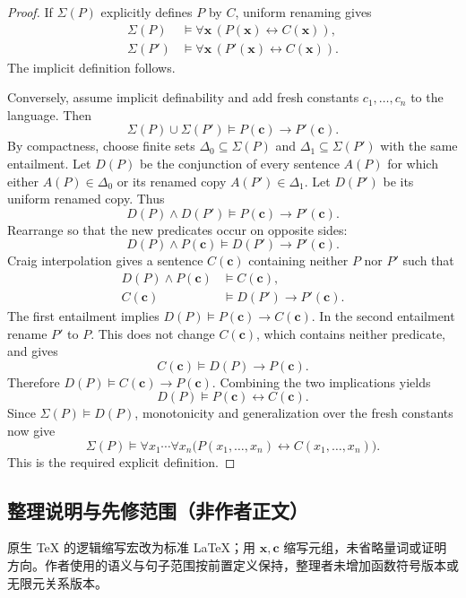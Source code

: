 \documentclass[UTF8,11pt]{ctexart}
\theoremstyle{definition}
\begin{document}
\begin{proof}
If $\Sigma(P)$ explicitly defines $P$ by $C$, uniform renaming gives
\[
\begin{aligned}
 \Sigma(P)&\models\forall\mathbf x\,(P(\mathbf x)\leftrightarrow C(\mathbf x)),\\
 \Sigma(P')&\models\forall\mathbf x\,(P'(\mathbf x)\leftrightarrow C(\mathbf x)).
\end{aligned}
\]
The implicit definition follows.

Conversely, assume implicit definability and add fresh constants
$c_1,\ldots,c_n$ to the language. Then
\[
 \Sigma(P)\cup\Sigma(P')\models P(\mathbf c)\to P'(\mathbf c).
\]
By compactness, choose finite sets $\Delta_0\subseteq\Sigma(P)$ and
$\Delta_1\subseteq\Sigma(P')$ with the same entailment. Let $D(P)$ be the
conjunction of every sentence $A(P)$ for which either $A(P)\in\Delta_0$
or its renamed copy $A(P')\in\Delta_1$. Let $D(P')$ be its uniform renamed
copy. Thus
\[
 D(P)\land D(P')\models P(\mathbf c)\to P'(\mathbf c).
\]
Rearrange so that the new predicates occur on opposite sides:
\[
 D(P)\land P(\mathbf c)\models D(P')\to P'(\mathbf c).
\]
Craig interpolation gives a sentence $C(\mathbf c)$ containing neither
$P$ nor $P'$ such that
\[
\begin{aligned}
 D(P)\land P(\mathbf c)&\models C(\mathbf c),\\
 C(\mathbf c)&\models D(P')\to P'(\mathbf c).
\end{aligned}
\]
The first entailment implies
$D(P)\models P(\mathbf c)\to C(\mathbf c)$.
In the second entailment rename $P'$ to $P$. This does not change
$C(\mathbf c)$, which contains neither predicate, and gives
\[
 C(\mathbf c)\models D(P)\to P(\mathbf c).
\]
Therefore $D(P)\models C(\mathbf c)\to P(\mathbf c)$. Combining the two
implications yields
\[
 D(P)\models P(\mathbf c)\leftrightarrow C(\mathbf c).
\]
Since $\Sigma(P)\models D(P)$, monotonicity and generalization over the
fresh constants now give
\[
 \Sigma(P)\models\forall x_1\cdots\forall x_n
        \bigl(P(x_1,\ldots,x_n)\leftrightarrow C(x_1,\ldots,x_n)\bigr).
\]
This is the required explicit definition.
\end{proof}

\subsection*{整理说明与先修范围（非作者正文）}
原生 TeX 的逻辑缩写宏改为标准 LaTeX；用 $\mathbf x,\mathbf c$ 缩写元组，未省略量词或证明方向。作者使用的语义与句子范围按前置定义保持，整理者未增加函数符号版本或无限元关系版本。
\end{document}
